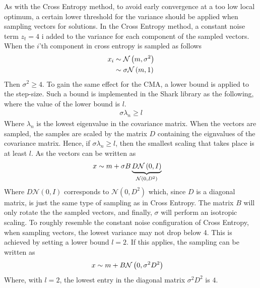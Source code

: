As with the Cross Entropy method, to avoid early convergence
at a too low local optimum, a 
certain lower threshold for the variance should be applied when 
sampling vectors for solutions. In the Cross Entropy method, a constant 
noise term $z_t = 4$ i added to the variance for each component
of the sampled vectors. When the $i$'th component in cross entropy is
sampled as follows
\begin{align*}
x_i &\sim \mathcal{N}\left(m, \sigma^{2}\right)\\
              &\sim \sigma \mathcal{N}\left(m, 1\right)
\end{align*}
Then $\sigma^{2} \geq 4$. To gain the same effect for the CMA, a lower bound 
is applied to the step-size. Such a bound is implemented in the Shark library
as the following, where the value of the lower bound is $l$.
\begin{align*}
\sigma  \lambda_n \geq l
\end{align*}
Where $\lambda_n$ is the lowest eigenvalue in the covariance matrix. 
When the vectors are sampled, the samples are scaled by the matrix $D$
containing the eignvalues of the covariance matrix. 
Hence, if $\sigma \lambda_n \geq l$, then the smallest scaling
that takes place is at least $l$. As the vectors can be written 
as
\begin{align*}
x &\sim m + \sigma B 
\underbrace{D \mathcal{N}\left(0, I \right)}_{\mathcal{N}\left(0, D^2 \right)}
\end{align*}
Where $D \mathcal{N}\left(0, I \right)$ corresponds to 
$\mathcal{N}\left(0, D^2 \right)$ which, since $D$ is a diagonal
matrix, is just the same type of sampling as in Cross Entropy. 
The matrix $B$ will only rotate the the sampled vectors, and finally,
$\sigma$ will perform an isotropic scaling. 
To roughly resemble the constant noise configuration of Cross Entropy,
when sampling vectors, the lowest variance may not drop below 4. 
This is achieved by setting a lower bound $l=2$. If this applies,
the sampling can be written as
\begin{align*}
x &\sim m +  B \mathcal{N}\left(0, \sigma^2 D^2 \right)
\end{align*}
Where, with $l=2$, the lowest entry in the diagonal matrix $\sigma^2 D^2$
is $4$.



\\

